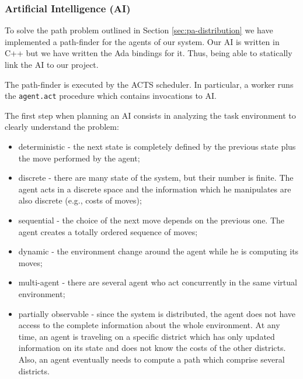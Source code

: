\subsubsection{Artificial Intelligence (AI)}

To solve the path
problem outlined in Section \ref{sec:pa-distribution}
we have implemented a path-finder for the agents of our system.
Our AI is written in C++ but we have written the Ada bindings for it.
Thus, being able to statically link the AI to our project.

The path-finder is executed by the ACTS scheduler. In particular, a
worker runs the \verb|agent.act| procedure which contains invocations
to AI.




The first step when planning an AI consists in analyzing the task environment
to clearly understand the problem:

\begin{itemize}

\item{deterministic} -
the next state is completely defined by the previous state plus the move
performed by the agent;

\item{discrete} -
there are many state of the system, but their number is finite.
The agent acts in a discrete space and the information which he manipulates
are also discrete (e.g., costs of moves);

\item{sequential} -
the choice of the next move depends on the previous one. The agent creates
a totally ordered sequence of moves;

\item{dynamic} -
the environment change around the agent while he is computing its moves;

\item{multi-agent} -
there are several agent who act concurrently in the same virtual
environment;

\item{partially observable} -
since the system is distributed, the agent does not have access to the complete
information about the whole environment. At any time, an agent is
traveling on a
specific district which has only updated information on its state and does not
know the costs of the other districts. Also, an agent eventually needs to
compute a path which comprise several districts.
\end{itemize}


